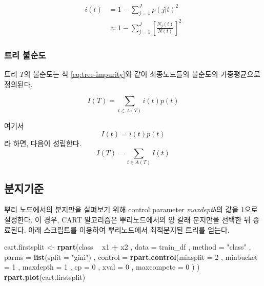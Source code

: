 \documentclass[]{book}
\newenvironment{Shaded}{\begin{snugshade}}{\end{snugshade}}
\newcommand{\DataTypeTok}[1]{\textcolor[rgb]{0.13,0.29,0.53}{#1}}
\newcommand{\DecValTok}[1]{\textcolor[rgb]{0.00,0.00,0.81}{#1}}
\newcommand{\KeywordTok}[1]{\textcolor[rgb]{0.13,0.29,0.53}{\textbf{#1}}}
\newcommand{\NormalTok}[1]{#1}
\newcommand{\OperatorTok}[1]{\textcolor[rgb]{0.81,0.36,0.00}{\textbf{#1}}}
\newcommand{\StringTok}[1]{\textcolor[rgb]{0.31,0.60,0.02}{#1}}
\begin{document}
\begin{equation}
\begin{split}
i(t) &= 1 - \sum_{j=1}^{J} p(j|t)^2\\
&\approx 1 - \sum_{j=1}^{J} \left[\frac{N_j(t)}{N(t)}\right]^2
\end{split}
\label{eq:node-impurity}
\end{equation}

\hypertarget{-}{%
\subsubsection{트리 불순도}\label{-}}

트리 \(T\)의 불순도는 식 \eqref{eq:tree-impurity}와 같이 최종노드들의 불순도의 가중평균으로 정의된다.

\begin{equation}
I(T) = \sum_{t \in A(T)} i(t)p(t) \label{eq:tree-impurity}
\end{equation}

여기서
\[ I(t) = i(t)p(t) \]
라 하면, 다음이 성립한다.
\[ I(T) = \sum_{t \in A(T)} I(t) \]

\hypertarget{cart-split}{%
\subsection{분지기준}\label{cart-split}}

뿌리 노드에서의 분지만을 살펴보기 위해 control parameter \emph{maxdepth}의 값을 1으로 설정한다. 이 경우, CART 알고리즘은 뿌리노드에서의 양 갈래 분지만을 선택한 뒤 종료된다. 아래 스크립트를 이용하여 뿌리노드에서 최적분지된 트리를 얻는다.

\begin{Shaded}
\begin{Highlighting}[]
\NormalTok{cart.firstsplit <-}\StringTok{ }\KeywordTok{rpart}\NormalTok{(class }\OperatorTok{~}\StringTok{ }\NormalTok{x1 }\OperatorTok{+}\StringTok{ }\NormalTok{x2}
\NormalTok{                  , }\DataTypeTok{data =}\NormalTok{ train_df}
\NormalTok{                  , }\DataTypeTok{method =} \StringTok{"class"}
\NormalTok{                  , }\DataTypeTok{parms =} \KeywordTok{list}\NormalTok{(}\DataTypeTok{split =} \StringTok{"gini"}\NormalTok{)}
\NormalTok{                  , }\DataTypeTok{control =} \KeywordTok{rpart.control}\NormalTok{(}\DataTypeTok{minsplit =} \DecValTok{2}
\NormalTok{                                          , }\DataTypeTok{minbucket =} \DecValTok{1}
\NormalTok{                                          , }\DataTypeTok{maxdepth =} \DecValTok{1}
\NormalTok{                                          , }\DataTypeTok{cp =} \DecValTok{0}
\NormalTok{                                          , }\DataTypeTok{xval =} \DecValTok{0}
\NormalTok{                                          , }\DataTypeTok{maxcompete =} \DecValTok{0}
\NormalTok{                                          )}
\NormalTok{                  )}
\KeywordTok{rpart.plot}\NormalTok{(cart.firstsplit)}
\end{Highlighting}
\end{Shaded}
\end{document}
